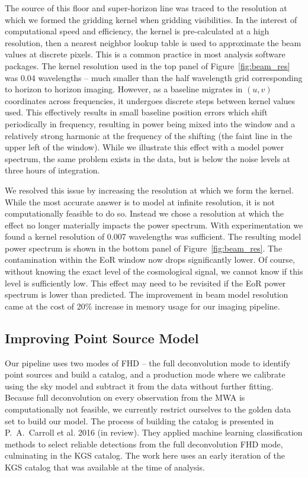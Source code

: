 \documentclass[iop]{emulateapj}
\begin{document}
The source of this floor and super-horizon line was traced to the resolution at which we 
formed the gridding kernel when gridding visibilities. In the interest of computational speed 
and efficiency, the kernel is pre-calculated at a high resolution, then a nearest neighbor 
lookup table is used to approximate the beam values at discrete pixels. 
This is a common practice in most analysis software packages.
The kernel 
resolution used in the top panel of Figure~\ref{fig:beam_res} was 0.04 wavelengths -- much 
smaller than the half wavelength grid corresponding to horizon to horizon imaging. 
However, as a baseline migrates in $(u,v)$ coordinates across frequencies, it 
undergoes discrete steps between kernel values used. This effectively results in small 
baseline position errors which shift periodically in frequency, resulting in power being mixed 
into the window and a relatively strong harmonic at the frequency of the shifting (the faint 
line in the upper left of the window). While we illustrate this effect with a model power 
spectrum, the same problem exists in the data, but is below the noise levels at three hours 
of integration.

We resolved this issue by increasing the resolution at which we form the kernel. While the 
most accurate answer is to model at infinite resolution, it is not computationally feasible to do 
so. Instead we chose a resolution at which the effect no longer materially 
impacts the power spectrum. With experimentation we found a kernel resolution of 0.007 
wavelengths was sufficient. The resulting model power spectrum is shown in the bottom 
panel of Figure~\ref{fig:beam_res}. 
The contamination within the EoR window now drops significantly lower. Of course, without
knowing the exact level of the cosmological signal, we cannot know if this level is sufficiently 
low. This effect may need to be revisited if the EoR power spectrum is lower than 
predicted.
The improvement in beam
model resolution came at the cost of 20\% increase in memory usage for our imaging
pipeline.

\subsection{Improving Point Source Model}

Our pipeline uses two modes of FHD -- the full deconvolution mode to identify point sources 
and build a catalog, and a production mode where we calibrate using the sky model and 
subtract it from the data without further fitting. Because full deconvolution on every 
observation from the MWA is computationally not feasible, we currently restrict ourselves to 
the golden data set to build our model. The process of building the catalog is presented in 
P.~A.~Carroll et al. 2016 (in review). They applied machine learning classification methods 
to select reliable detections from the full deconvolution FHD mode, culminating in the KGS 
catalog. The work here uses an early iteration of the KGS catalog that was available at the 
time of analysis.
\end{document}
